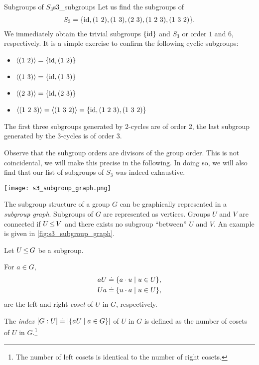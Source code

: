 \begin{ex}{Subgroups of $S_3$}{s3_subgroups}
Let us find the subgroups of \begin{align*}
    S_3 = \{\mathrm{id}, (1\ 2), (1\ 3), (2\ 3), (1\ 2\ 3), (1\ 3\ 2)\}.
\end{align*} We immediately obtain the trivial subgroups $\{\mathrm{id}\}$ and $S_3$ or order $1$ and $6$, respectively. It is a simple exercise to confirm the following cyclic subgroups: \begin{itemize}
    \item $\gen{(1\ 2)} = \{\id, (1\ 2)\}$
    \item $\gen{(1\ 3)} = \{\id, (1\ 3)\}$
    \item $\gen{(2\ 3)} = \{\id, (2\ 3)\}$
    \item $\langle (1\ 2\ 3) \rangle = \langle (1\ 3\ 2) \rangle = \{\mathrm{id}, (1\ 2\ 3), (1\ 3\ 2)\}$
\end{itemize} The first three subgroups generated by 2-cycles are of order 2, the last subgroup generated by the 3-cycles is of order 3.

Observe that the subgroup orders are divisors of the group order. This is not coincidental, we will make this precise in the following. In doing so, we will also find that our list of subgroups of $S_3$ was indeed exhaustive.
\end{ex}

\begin{marginfigure}
    \texttt{[image: s3\_subgroup\_graph.png]}
    \caption{Subgroup graph of the symmetric group $S_3$. The order of the subgroups is shown in orange.}\label{fig:s3_subgroup_graph}
\end{marginfigure}
    
The subgroup structure of a group $G$ can be graphically represented in a \emph{subgroup graph}. Subgroups of $G$ are represented as vertices. Groups $U$ and $V$ are connected if $U \operatorname*{\leq} V$ and there exists no subgroup ``between'' $U$ and $V$. An example is given in \cref{fig:s3_subgroup_graph}.

\begin{defn}
Let $U \operatorname*{\leq} G$ be a subgroup.
\begin{defnlist}
    \item For $a \in G$, \begin{align}
        aU &\overset{.}{=} \{a \cdot u \mid u \in U\}, \\
        Ua &\overset{.}{=} \{u \cdot a \mid u \in U\},
    \end{align} are the left and right \emph{coset} of $U$ in $G$, respectively.
    \item The \emph{index} $[G : U] \overset{.}{=} |\{aU \mid a \in G\}|$ of $U$ in $G$ is defined as the number of cosets of $U$ in $G$.\footnote{The number of left cosets is identical to the number of right cosets.}
\end{defnlist}
\end{defn}

